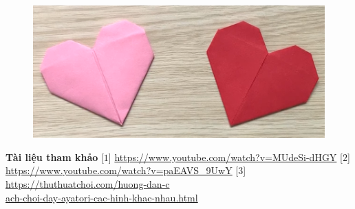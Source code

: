 \begin{multicols}{2}
\begin{figure}[H]
			\centering
			\captionsetup{labelformat= empty, justification=centering}
			\includegraphics[width= 1\linewidth]{44}
			\vspace*{-15pt}
		\end{figure}
	\textbf{\color{toancuabi}Tài liệu tham khảo}
	\vskip 0.1cm
	[$1$] \url{https://www.youtube.com/watch?v=MUdeSi-dHGY}
	\vskip 0.1cm
	[$2$] \url{https://www.youtube.com/watch?v=paEAVS_9UwY}
	\vskip 0.1cm
	[$3$] \url{https://thuthuatchoi.com/huong-dan-c}\\
	\url{ach-choi-day-ayatori-cac-hinh-khac-nhau.html}
\end{multicols}
\newpage
\begingroup
\thispagestyle{toancuabinone}
